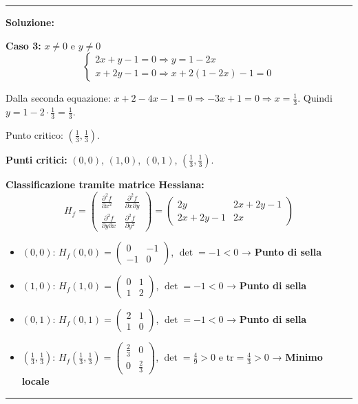 \documentclass[12pt, a4paper]{article}
\newenvironment{solution}
{\par\noindent\rule{\textwidth}{0.4pt}\par\textbf{Soluzione:}\medskip\par}
{\par\rule{\textwidth}{0.4pt}\par\bigskip}
\begin{document}
\begin{solution}
\textbf{Caso 3:} $x \neq 0$ e $y \neq 0$
\[
\begin{cases}
2x + y - 1 = 0 \Rightarrow y = 1 - 2x \\
x + 2y - 1 = 0 \Rightarrow x + 2(1 - 2x) - 1 = 0
\end{cases}
\]

Dalla seconda equazione: $x + 2 - 4x - 1 = 0 \Rightarrow -3x + 1 = 0 \Rightarrow x = \frac{1}{3}$.
Quindi $y = 1 - 2 \cdot \frac{1}{3} = \frac{1}{3}$.

Punto critico: $\left(\frac{1}{3}, \frac{1}{3}\right)$.

\textbf{Punti critici:} $(0, 0)$, $(1, 0)$, $(0, 1)$, $\left(\frac{1}{3}, \frac{1}{3}\right)$.

\textbf{Classificazione tramite matrice Hessiana:}
\[
H_f = \begin{pmatrix}
\frac{\partial^2 f}{\partial x^2} & \frac{\partial^2 f}{\partial x \partial y} \\
\frac{\partial^2 f}{\partial y \partial x} & \frac{\partial^2 f}{\partial y^2}
\end{pmatrix} = \begin{pmatrix}
2y & 2x + 2y - 1 \\
2x + 2y - 1 & 2x
\end{pmatrix}
\]

\begin{itemize}
\item $(0, 0)$: $H_f(0,0) = \begin{pmatrix} 0 & -1 \\ -1 & 0 \end{pmatrix}$, $\det = -1 < 0$ → \textbf{Punto di sella}

\item $(1, 0)$: $H_f(1,0) = \begin{pmatrix} 0 & 1 \\ 1 & 2 \end{pmatrix}$, $\det = -1 < 0$ → \textbf{Punto di sella}

\item $(0, 1)$: $H_f(0,1) = \begin{pmatrix} 2 & 1 \\ 1 & 0 \end{pmatrix}$, $\det = -1 < 0$ → \textbf{Punto di sella}

\item $\left(\frac{1}{3}, \frac{1}{3}\right)$: $H_f\left(\frac{1}{3}, \frac{1}{3}\right) = \begin{pmatrix} \frac{2}{3} & 0 \\ 0 & \frac{2}{3} \end{pmatrix}$, $\det = \frac{4}{9} > 0$ e $\text{tr} = \frac{4}{3} > 0$ → \textbf{Minimo locale}
\end{itemize}


\end{solution}
\end{document}
